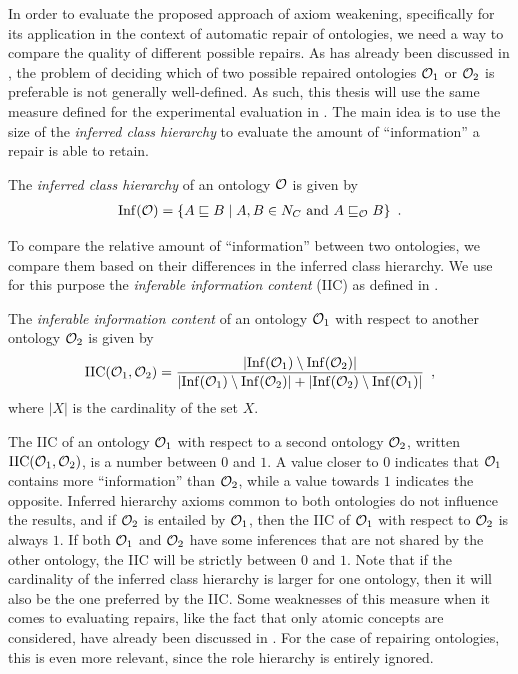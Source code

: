 
In order to evaluate the proposed approach of axiom weakening, specifically for its application in the context of automatic repair of ontologies, we need a way to compare the quality of different possible repairs. As has already been discussed in \cite{troquard2018repairing}, the problem of deciding which of two possible repaired ontologies $\mathcal{O}_1$ or $\mathcal{O}_2$ is preferable is not generally well-defined. As such, this thesis will use the same measure defined for the experimental evaluation in \cite{troquard2018repairing}. The main idea is to use the size of the \emph{inferred class hierarchy} to evaluate the amount of ``information'' a repair is able to retain.

\begin{definition}\label{def:inf}
  The \emph{inferred class hierarchy} of an ontology $\mathcal{O}$ is given by
  \begin{align*}
    {\ensuremath{\operatorname{Inf}}}(\mathcal{O}) = \{ A \sqsubseteq B \mid A, B \in N_C \text{ and } A \sqsubseteq_\mathcal{O} B \} \enspace.
  \end{align*}
\end{definition}

To compare the relative amount of ``information'' between two ontologies, we compare them based on their differences in the inferred class hierarchy. We use for this purpose the \emph{inferable information content} (IIC) as defined in \cite{troquard2018repairing}.

\begin{definition}\label{def:iic}
  The \emph{inferable information content} of an ontology $\mathcal{O}_1$ with respect to another ontology $\mathcal{O}_2$ is given by
  \begin{align*}
    {\ensuremath{\operatorname{IIC}}}(\mathcal{O}_1, \mathcal{O}_2) = \frac{| {\operatorname{Inf}}(\mathcal{O}_1) \setminus {\ensuremath{\operatorname{Inf}}}(\mathcal{O}_2) |}{|{\operatorname{Inf}}(\mathcal{O}_1) \setminus {\ensuremath{\operatorname{Inf}}}(\mathcal{O}_2)| + |{\operatorname{Inf}}(\mathcal{O}_2) \setminus {\ensuremath{\operatorname{Inf}}}(\mathcal{O}_1)|} \enspace,
  \end{align*}
  where $|X|$ is the cardinality of the set $X$.
\end{definition}

The IIC of an ontology $\mathcal{O}_1$ with respect to a second ontology $\mathcal{O}_2$, written ${\operatorname{IIC}}(\mathcal{O}_1, \mathcal{O}_2)$, is a number between $0$ and $1$. A value closer to $0$ indicates that $\mathcal{O}_1$ contains more ``information'' than $\mathcal{O}_2$, while a value towards $1$ indicates the opposite. Inferred hierarchy axioms common to both ontologies do not influence the results, and if $\mathcal{O}_2$ is entailed by $\mathcal{O}_1$, then the IIC of $\mathcal{O}_1$ with respect to $\mathcal{O}_2$ is always $1$. If both $\mathcal{O}_1$ and $\mathcal{O}_2$ have some inferences that are not shared by the other ontology, the IIC will be strictly between $0$ and $1$. Note that if the cardinality of the inferred class hierarchy is larger for one ontology, then it will also be the one preferred by the IIC. Some weaknesses of this measure when it comes to evaluating repairs, like the fact that only atomic concepts are considered, have already been discussed in \cite{troquard2018repairing}. For the case of repairing \SROIQ ontologies, this is even more relevant, since the role hierarchy is entirely ignored.

